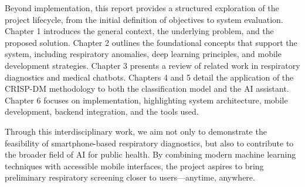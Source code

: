 Beyond implementation, this report provides a structured exploration of the project lifecycle, from the initial definition of objectives to system evaluation. Chapter 1 introduces the general context, the underlying problem, and the proposed solution. Chapter 2 outlines the foundational concepts that support the system, including respiratory anomalies, deep learning principles, and mobile development strategies. Chapter 3 presents a review of related work in respiratory diagnostics and medical chatbots. Chapters 4 and 5 detail the application of the CRISP-DM methodology to both the classification model and the AI assistant. Chapter 6 focuses on implementation, highlighting system architecture, mobile development, backend integration, and the tools used.

Through this interdisciplinary work, we aim not only to demonstrate the feasibility of smartphone-based respiratory diagnostics, but also to contribute to the broader field of AI for public health. By combining modern machine learning techniques with accessible mobile interfaces, the project aspires to bring preliminary respiratory screening closer to users—anytime, anywhere.

